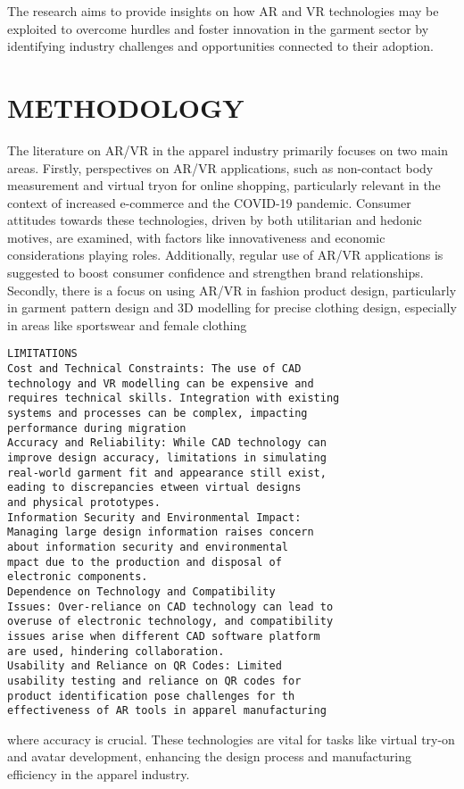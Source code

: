 \documentclass[10pt]{article}
\begin{document}
The research aims to provide insights on how AR and VR technologies may be exploited to overcome hurdles and foster innovation in the garment sector by identifying industry challenges and opportunities connected to their adoption.

\section*{METHODOLOGY}
The literature on AR/VR in the apparel industry primarily focuses on two main areas. Firstly, perspectives on AR/VR applications, such as non-contact body measurement and virtual tryon for online shopping, particularly relevant in the context of increased e-commerce and the COVID-19 pandemic. Consumer attitudes towards these technologies, driven by both utilitarian and hedonic motives, are examined, with factors like innovativeness and economic considerations playing roles. Additionally, regular use of AR/VR applications is suggested to boost consumer confidence and strengthen brand relationships. Secondly, there is a focus on using AR/VR in fashion product design, particularly in garment pattern design and 3D modelling for precise clothing design, especially in areas like sportswear and female clothing

\begin{verbatim}
LIMITATIONS
Cost and Technical Constraints: The use of CAD
technology and VR modelling can be expensive and
requires technical skills. Integration with existing
systems and processes can be complex, impacting
performance during migration
Accuracy and Reliability: While CAD technology can
improve design accuracy, limitations in simulating
real-world garment fit and appearance still exist,
eading to discrepancies etween virtual designs
and physical prototypes.
Information Security and Environmental Impact:
Managing large design information raises concern
about information security and environmental
mpact due to the production and disposal of
electronic components.
Dependence on Technology and Compatibility
Issues: Over-reliance on CAD technology can lead to
overuse of electronic technology, and compatibility
issues arise when different CAD software platform
are used, hindering collaboration.
Usability and Reliance on QR Codes: Limited
usability testing and reliance on QR codes for
product identification pose challenges for th
effectiveness of AR tools in apparel manufacturing
\end{verbatim}

where accuracy is crucial. These technologies are vital for tasks like virtual try-on and avatar development, enhancing the design process and manufacturing efficiency in the apparel industry.
\end{document}
